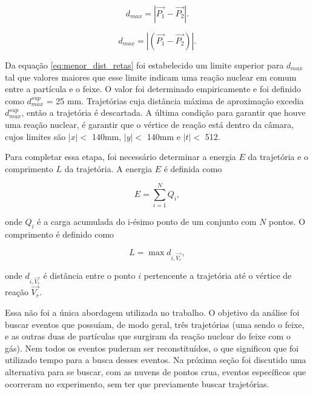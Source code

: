 \documentclass[a4paper,12pt,oneside]{book}
\begin{document}
\begin{equation} \label{eq:menor_dist_retas}
    d_{max} = \left | \vec{P_1} - \vec{P_2} \right |.
\end{equation}


\begin{equation}
    d_{max} = \left | \left(\vec{P_1} - \vec{P_2}\right) \right |.
\end{equation}

\par Da equação \ref{eq:menor_dist_retas} foi estabelecido um limite superior para $d_{max}$ tal que valores maiores que esse limite indicam uma reação nuclear em comum entre a partícula e o feixe. O valor foi determinado empiricamente e foi definido como $d_{max}^{sup}$ = 25 mm. Trajetórias cuja distância máxima de aproximação excedia $d_{max}^{sup}$, então a trajetória é descartada. A última condição para garantir que houve uma reação nuclear, é garantir que o vértice de reação está dentro da câmara, cujos limites são $|x| < $ 140mm, $|y| < $ 140mm e $|t| < $ 512.

\par Para completar essa etapa, foi necessário determinar a energia $E$ da trajetória e o comprimento $L$ da trajetória. A energia $E$ é definida como

\begin{equation}
	E = \sum_{i = 1}^{N} Q_i,
\end{equation}

\par onde $Q_i$ é a carga acumulada do i-ésimo ponto de um conjunto com $N$ pontos. O comprimento é definido como

\begin{equation}
	L = \max{d_{i, \vec{V_r}}},
\end{equation}

\par onde $d_{i, \vec{V_r}}$ é distância entre o ponto $i$ pertencente a trajetória até o vértice de reação $\vec{V_r}$.

\par Essa não foi a única abordagem utilizada no trabalho. O objetivo da análise foi buscar eventos que possuíam, de modo geral, três trajetórias (uma sendo o feixe, e as outras duas de partículas que surgiram da reação nuclear do feixe com o gás). Nem todos os eventos puderam ser reconstituídos, o que significou que foi utilizado tempo para a busca desses eventos. Na próxima seção foi discutido uma alternativa para se buscar, com as nuvens de pontos crua, eventos específicos que ocorreram no experimento, sem ter que previamente buscar trajetórias.
\end{document}
